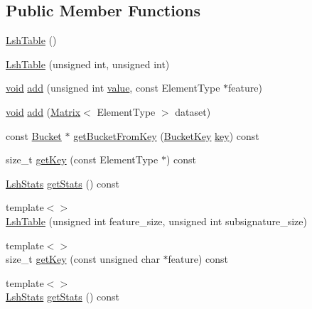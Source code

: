 \subsection*{Public Member Functions}
\begin{DoxyCompactItemize}
\item 
\hyperlink{classcvflann_1_1lsh_1_1LshTable_ae93b248f42dd10484b3a79977b9a22d1}{Lsh\-Table} ()
\item 
\hyperlink{classcvflann_1_1lsh_1_1LshTable_a291b3e5109005a16e71d9cbee3c272e4}{Lsh\-Table} (unsigned int, unsigned int)
\item 
\hyperlink{legacy_8hpp_a8bb47f092d473522721002c86c13b94e}{void} \hyperlink{classcvflann_1_1lsh_1_1LshTable_abcad1b9dca00f0d7b4f6751b8e2efcaf}{add} (unsigned int \hyperlink{highgui__c_8h_ad4670c92695d4327c21292905a803901}{value}, const Element\-Type $\ast$feature)
\item 
\hyperlink{legacy_8hpp_a8bb47f092d473522721002c86c13b94e}{void} \hyperlink{classcvflann_1_1lsh_1_1LshTable_a0364641a65b106381f2abd2f3f7aa9dd}{add} (\hyperlink{classcvflann_1_1Matrix}{Matrix}$<$ Element\-Type $>$ dataset)
\item 
const \hyperlink{namespacecvflann_1_1lsh_aef9e4f70918d6013ff72020141fa03d0}{Bucket} $\ast$ \hyperlink{classcvflann_1_1lsh_1_1LshTable_a7a4e2a63825c956c8db1774bf4551028}{get\-Bucket\-From\-Key} (\hyperlink{namespacecvflann_1_1lsh_a798313f0f282f24b311c4cc90e2a6619}{Bucket\-Key} \hyperlink{core__c_8h_a68cf695b604d08c0b6f6f6bb282a6586}{key}) const 
\item 
size\-\_\-t \hyperlink{classcvflann_1_1lsh_1_1LshTable_a14b2c3fa4250d86f2ea6dce52fb04259}{get\-Key} (const Element\-Type $\ast$) const 
\item 
\hyperlink{structcvflann_1_1lsh_1_1LshStats}{Lsh\-Stats} \hyperlink{classcvflann_1_1lsh_1_1LshTable_ac7dbc34e5b5c5893150bb5bb81938a4a}{get\-Stats} () const 
\item 
{\footnotesize template$<$$>$ }\\\hyperlink{classcvflann_1_1lsh_1_1LshTable_a3e63596e7c91583059b7c2257ac0edd6}{Lsh\-Table} (unsigned int feature\-\_\-size, unsigned int subsignature\-\_\-size)
\item 
{\footnotesize template$<$$>$ }\\size\-\_\-t \hyperlink{classcvflann_1_1lsh_1_1LshTable_a29baafdaf992f86bf062c5b18f5e2be2}{get\-Key} (const unsigned char $\ast$feature) const
\item 
{\footnotesize template$<$$>$ }\\\hyperlink{structcvflann_1_1lsh_1_1LshStats}{Lsh\-Stats} \hyperlink{classcvflann_1_1lsh_1_1LshTable_a891b6401cfe3f0d565185f983bcaed8c}{get\-Stats} () const
\end{DoxyCompactItemize}


